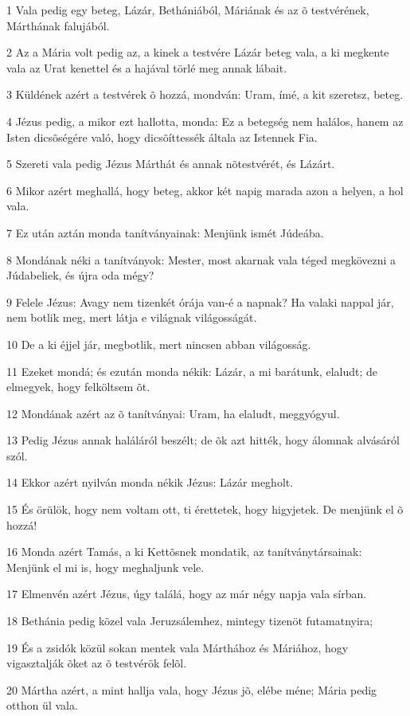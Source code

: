 \par 1 Vala pedig egy beteg, Lázár, Bethániából, Máriának és az õ testvérének, Márthának falujából.
\par 2 Az a Mária volt pedig az, a kinek a testvére Lázár beteg vala, a ki megkente vala az Urat kenettel és a hajával törlé meg annak lábait.
\par 3 Küldének azért a testvérek õ hozzá, mondván: Uram, ímé, a kit szeretsz, beteg.
\par 4 Jézus pedig, a mikor ezt hallotta, monda: Ez a betegség nem halálos, hanem az Isten dicsõségére való, hogy dicsõíttessék általa az Istennek Fia.
\par 5 Szereti vala pedig Jézus Márthát és annak nõtestvérét, és Lázárt.
\par 6 Mikor azért meghallá, hogy beteg, akkor két napig marada azon a helyen, a hol vala.
\par 7 Ez után aztán monda tanítványainak: Menjünk ismét Júdeába.
\par 8 Mondának néki a tanítványok: Mester, most akarnak vala téged megkövezni a Júdabeliek, és újra oda mégy?
\par 9 Felele Jézus: Avagy nem tizenkét órája van-é a napnak? Ha valaki nappal jár, nem botlik meg, mert látja e világnak világosságát.
\par 10 De a ki éjjel jár, megbotlik, mert nincsen abban világosság.
\par 11 Ezeket mondá; és ezután monda nékik: Lázár, a mi barátunk, elaludt; de elmegyek, hogy felköltsem õt.
\par 12 Mondának azért az õ tanítványai: Uram, ha elaludt, meggyógyul.
\par 13 Pedig Jézus annak haláláról beszélt; de õk azt hitték, hogy álomnak alvásáról szól.
\par 14 Ekkor azért nyilván monda nékik Jézus: Lázár megholt.
\par 15 És örülök, hogy nem voltam ott, ti érettetek, hogy higyjetek. De menjünk el õ hozzá!
\par 16 Monda azért Tamás, a ki Kettõsnek mondatik, az tanítványtársainak: Menjünk el mi is, hogy meghaljunk vele.
\par 17 Elmenvén azért Jézus, úgy találá, hogy az már négy napja vala sírban.
\par 18 Bethánia pedig közel vala Jeruzsálemhez, mintegy tizenöt futamatnyira;
\par 19 És a zsidók közül sokan mentek vala Márthához és Máriához, hogy vigasztalják õket az õ testvérök felõl.
\par 20 Mártha azért, a mint hallja vala, hogy Jézus jõ, elébe méne; Mária pedig otthon ül vala.

